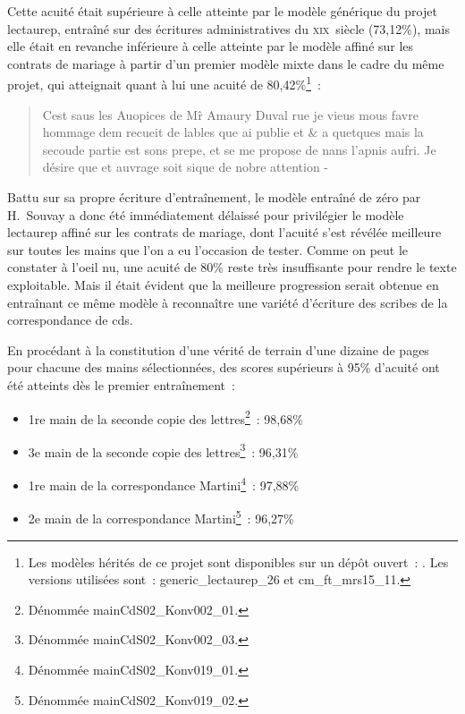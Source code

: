 \documentclass[a4paper,12pt,twoside]{book}
\newcommand{\siecle}[1]{\textsc{#1}\ieme}
\begin{document}
				Cette acuité était supérieure à celle atteinte par le modèle générique du projet \gls{lectaurep}, entraîné sur des écritures administratives du \siecle{xix}~siècle (73,12\%), mais elle était en revanche inférieure à celle atteinte par le modèle affiné sur les contrats de mariage à partir d'un premier modèle mixte dans le cadre du même projet, qui atteignait quant à lui une acuité de 80,42\%\footnote{Les modèles hérités de ce projet sont disponibles sur un dépôt ouvert~: \cite{KrakenModelsTranscription}. Les versions utilisées sont~: \textsf{generic\_lectaurep\_26} et \textsf{cm\_ft\_mrs15\_11}.}~:
				
				\begin{quote}
					\textsf{Cest saus les Auopices de M\^r Amaury Duval rue je vieus mous favre
					hommage dem recueit de lables que ai publie et \& a quetques mais
					la secoude partie est sons prepe, et se me propose de nans l'apnis
					aufri. Je désire que et auvrage soit sique de nobre attention -}
				\end{quote}
				
				Battu sur sa propre écriture d'entraînement, le modèle entraîné de zéro par H.~Souvay a donc été immédiatement délaissé pour privilégier le modèle \gls{lectaurep} affiné sur les contrats de mariage, dont l'acuité s'est révélée meilleure sur toutes les mains que l'on a eu l'occasion de tester. Comme on peut le constater à l'oeil nu, une acuité de 80\% reste très insuffisante pour rendre le texte exploitable. Mais il était évident que la meilleure progression serait obtenue en entraînant ce même modèle à reconnaître une variété d'écriture des scribes de la correspondance de \gls{cds}.
				
				En procédant à la constitution d'une vérité de terrain d'une dizaine de pages pour chacune des mains sélectionnées, des scores supérieurs à 95\% d'acuité ont été atteints dès le premier entraînement~:
				
				\begin{itemize}
					\item 1re main de la seconde copie des lettres\footnote{Dénommée \textsf{mainCdS02\_Konv002\_01}.}~: 98,68\%
					\item 3e main de la seconde copie des lettres\footnote{Dénommée \textsf{mainCdS02\_Konv002\_03}.}~: 96,31\%
					\item 1re main de la correspondance Martini\footnote{Dénommée \textsf{mainCdS02\_Konv019\_01}.}~: 97,88\%
					\item 2e main de la correspondance Martini\footnote{Dénommée \textsf{mainCdS02\_Konv019\_02}.}~: 96,27\%
				\end{itemize}
			
\end{document}
